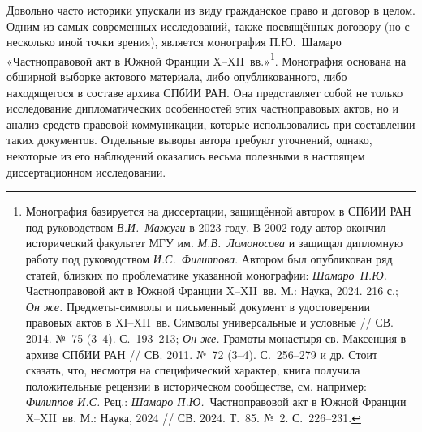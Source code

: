 Довольно часто историки упускали из виду гражданское право и договор в целом. Одним из самых современных исследований, также посвящённых договору (но с несколько иной точки зрения), является монография П.Ю.~Шамаро «Частноправовой акт в Южной Франции X--XII~вв.»\footnote{Монография базируется на диссертации, защищённой автором в СПбИИ РАН под руководством \emph{В.И.~Мажуги} в 2023 году. В 2002 году автор окончил исторический факультет МГУ им. \emph{М.В.~Ломоносова} и защищал дипломную работу под руководством \emph{И.С.~Филиппова}. Автором был опубликован ряд статей, близких по проблематике указанной монографии: \emph{Шамаро}\emph{~П.Ю.} Частноправовой акт в Южной Франции X--XII~вв. М.: Наука, 2024. 216 с.; \emph{Он же.} Предметы-символы и письменный документ в удостоверении правовых актов в XI--XII~вв. Символы универсальные и условные // СВ. 2014. №~75 (3--4). С.~193--213; \emph{Он же.} Грамоты монастыря св. Максенция в архиве СПбИИ РАН // СВ. 2011. №~72 (3--4). С.~256--279 и др. Стоит сказать, что, несмотря на специфический характер, книга получила положительные рецензии в историческом сообществе, см. например: \emph{Филиппов И.С. }Рец.: \emph{Шамаро П.Ю.}~Частноправовой акт в Южной Франции Х--XII~вв. М.: Наука, 2024 // СВ. 2024. Т.~85. №~2. С.~226--231.}. Монография основана на обширной выборке актового материала, либо опубликованного, либо находящегося в составе архива СПбИИ РАН. Она представляет собой не только исследование дипломатических особенностей этих частноправовых актов, но и анализ средств правовой коммуникации, которые использовались при составлении таких документов. Отдельные выводы автора требуют уточнений, однако, некоторые из его наблюдений оказались весьма полезными в настоящем диссертационном исследовании.

